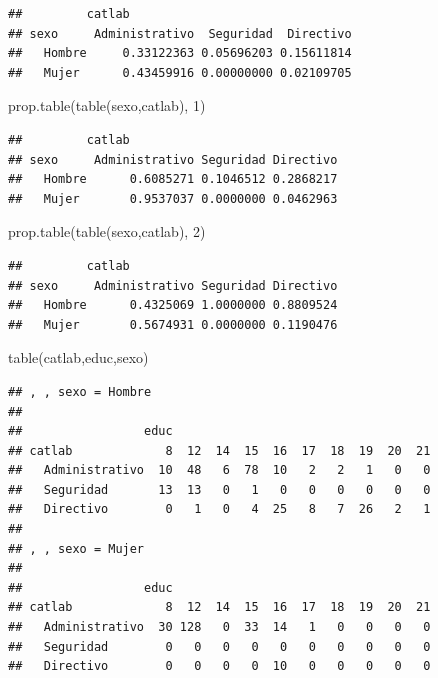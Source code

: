 \documentclass[
]{book}
\newenvironment{Shaded}{\begin{snugshade}}{\end{snugshade}}
\newcommand{\DecValTok}[1]{\textcolor[rgb]{0.00,0.00,0.81}{#1}}
\newcommand{\FunctionTok}[1]{\textcolor[rgb]{0.00,0.00,0.00}{#1}}
\newcommand{\NormalTok}[1]{#1}
\theoremstyle{break}
\theoremstyle{nonumberplain}
\begin{document}
\begin{verbatim}
##         catlab
## sexo     Administrativo  Seguridad  Directivo
##   Hombre     0.33122363 0.05696203 0.15611814
##   Mujer      0.43459916 0.00000000 0.02109705
\end{verbatim}

\begin{Shaded}
\begin{Highlighting}[]
\FunctionTok{prop.table}\NormalTok{(}\FunctionTok{table}\NormalTok{(sexo,catlab), }\DecValTok{1}\NormalTok{)}
\end{Highlighting}
\end{Shaded}

\begin{verbatim}
##         catlab
## sexo     Administrativo Seguridad Directivo
##   Hombre      0.6085271 0.1046512 0.2868217
##   Mujer       0.9537037 0.0000000 0.0462963
\end{verbatim}

\begin{Shaded}
\begin{Highlighting}[]
\FunctionTok{prop.table}\NormalTok{(}\FunctionTok{table}\NormalTok{(sexo,catlab), }\DecValTok{2}\NormalTok{)}
\end{Highlighting}
\end{Shaded}

\begin{verbatim}
##         catlab
## sexo     Administrativo Seguridad Directivo
##   Hombre      0.4325069 1.0000000 0.8809524
##   Mujer       0.5674931 0.0000000 0.1190476
\end{verbatim}

\begin{Shaded}
\begin{Highlighting}[]
\FunctionTok{table}\NormalTok{(catlab,educ,sexo)}
\end{Highlighting}
\end{Shaded}

\begin{verbatim}
## , , sexo = Hombre
## 
##                 educ
## catlab             8  12  14  15  16  17  18  19  20  21
##   Administrativo  10  48   6  78  10   2   2   1   0   0
##   Seguridad       13  13   0   1   0   0   0   0   0   0
##   Directivo        0   1   0   4  25   8   7  26   2   1
## 
## , , sexo = Mujer
## 
##                 educ
## catlab             8  12  14  15  16  17  18  19  20  21
##   Administrativo  30 128   0  33  14   1   0   0   0   0
##   Seguridad        0   0   0   0   0   0   0   0   0   0
##   Directivo        0   0   0   0  10   0   0   0   0   0
\end{verbatim}
\end{document}
